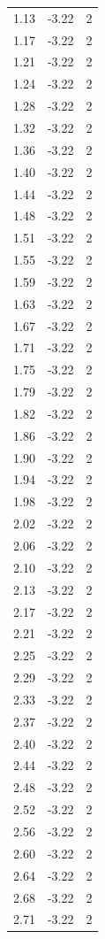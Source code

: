 \begin{longtable}{lrr}
  1.13 & -3.22 & 2 \\
  1.17 & -3.22 & 2 \\
  1.21 & -3.22 & 2 \\
  1.24 & -3.22 & 2 \\
  1.28 & -3.22 & 2 \\
  1.32 & -3.22 & 2 \\
  1.36 & -3.22 & 2 \\
  1.40 & -3.22 & 2 \\
  1.44 & -3.22 & 2 \\
  1.48 & -3.22 & 2 \\
  1.51 & -3.22 & 2 \\
  1.55 & -3.22 & 2 \\
  1.59 & -3.22 & 2 \\
  1.63 & -3.22 & 2 \\
  1.67 & -3.22 & 2 \\
  1.71 & -3.22 & 2 \\
  1.75 & -3.22 & 2 \\
  1.79 & -3.22 & 2 \\
  1.82 & -3.22 & 2 \\
  1.86 & -3.22 & 2 \\
  1.90 & -3.22 & 2 \\
  1.94 & -3.22 & 2 \\
  1.98 & -3.22 & 2 \\
  2.02 & -3.22 & 2 \\
  2.06 & -3.22 & 2 \\
  2.10 & -3.22 & 2 \\
  2.13 & -3.22 & 2 \\
  2.17 & -3.22 & 2 \\
  2.21 & -3.22 & 2 \\
  2.25 & -3.22 & 2 \\
  2.29 & -3.22 & 2 \\
  2.33 & -3.22 & 2 \\
  2.37 & -3.22 & 2 \\
  2.40 & -3.22 & 2 \\
  2.44 & -3.22 & 2 \\
  2.48 & -3.22 & 2 \\
  2.52 & -3.22 & 2 \\
  2.56 & -3.22 & 2 \\
  2.60 & -3.22 & 2 \\
  2.64 & -3.22 & 2 \\
  2.68 & -3.22 & 2 \\
  2.71 & -3.22 & 2 \\

\end{longtable}
